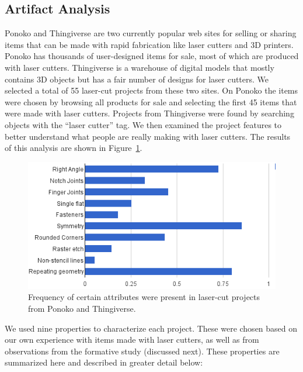 \documentclass{article}
\begin{document}
\subsection{Artifact Analysis}

Ponoko and Thingiverse are two currently popular web sites for selling
or sharing items that can be made with rapid fabrication like laser
cutters and 3D printers. Ponoko has thousands of user-designed items
for sale, most of which are produced with laser cutters. Thingiverse
is a warehouse of digital models that mostly contains 3D objects but
has a fair number of designs for laser cutters. We selected a total of
55 laser-cut projects from these two sites. On Ponoko the items were
chosen by browsing all products for sale and selecting the first 45
items that were made with laser cutters. Projects from Thingiverse
were found by searching objects with the ``laser cutter'' tag. We then
examined the project features to better understand what people are
really making with laser cutters. The results of this analysis are
shown in Figure~\ref{fig:ponoko}.

\begin{figure}[h]
  \includegraphics[width=0.9\linewidth]{img/ponoko-analysis.png}
  \caption{Frequency of certain attributes were present in laser-cut
    projects from Ponoko and Thingiverse.}
  \label{fig:ponoko}
\end{figure}

We used nine properties to characterize each project. These were
chosen based on our own experience with items made with laser cutters,
as well as from observations from the formative study (discussed
next). These properties are summarized here and described in greater
detail below:
\end{document}
